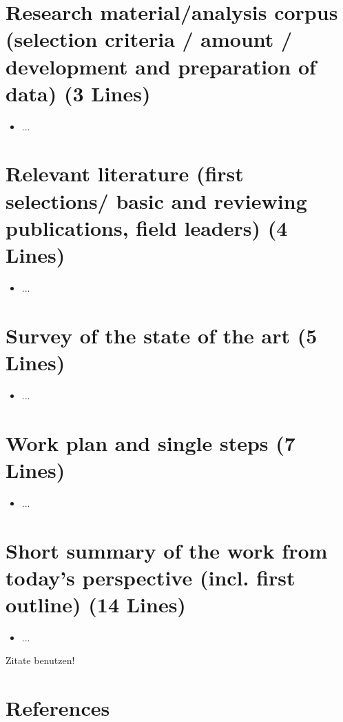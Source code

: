 \section*{Research material/analysis corpus (selection criteria / amount / development and preparation of data) (3 Lines)}

\begin{itemize}
    \item ...
 
\end{itemize}


\section*{Relevant literature (first selections/ basic and reviewing publications, field leaders) (4 Lines) }
\begin{itemize}
    \item ...
 
\end{itemize}


\section*{Survey of the state of the art (5 Lines)}
\begin{itemize}
    \item ...
 
\end{itemize}

\section*{Work plan and single steps (7 Lines)}
\begin{itemize}
    \item ...
 
\end{itemize}

\section*{Short summary of the work from today’s perspective (incl. first outline) (14 Lines)}
\begin{itemize}
    \item ...
 
\end{itemize}




Zitate benutzen! \cite{microBpm}
\section*{References}
\printbibliography[heading=none]

